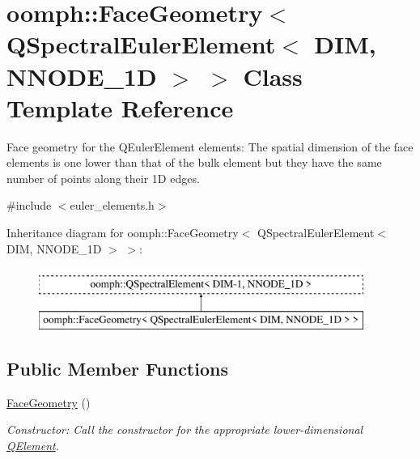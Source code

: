 \hypertarget{classoomph_1_1FaceGeometry_3_01QSpectralEulerElement_3_01DIM_00_01NNODE__1D_01_4_01_4}{}\section{oomph\+:\+:Face\+Geometry$<$ Q\+Spectral\+Euler\+Element$<$ D\+IM, N\+N\+O\+D\+E\+\_\+1D $>$ $>$ Class Template Reference}
\label{classoomph_1_1FaceGeometry_3_01QSpectralEulerElement_3_01DIM_00_01NNODE__1D_01_4_01_4}


Face geometry for the Q\+Euler\+Element elements\+: The spatial dimension of the face elements is one lower than that of the bulk element but they have the same number of points along their 1D edges.  




{\ttfamily \#include $<$euler\+\_\+elements.\+h$>$}

Inheritance diagram for oomph\+:\+:Face\+Geometry$<$ Q\+Spectral\+Euler\+Element$<$ D\+IM, N\+N\+O\+D\+E\+\_\+1D $>$ $>$\+:\begin{figure}[H]
\begin{center}
\leavevmode
\includegraphics[height=2.000000cm]{classoomph_1_1FaceGeometry_3_01QSpectralEulerElement_3_01DIM_00_01NNODE__1D_01_4_01_4}
\end{center}
\end{figure}
\subsection*{Public Member Functions}
\begin{DoxyCompactItemize}
\item 
\hyperlink{classoomph_1_1FaceGeometry_3_01QSpectralEulerElement_3_01DIM_00_01NNODE__1D_01_4_01_4_ac68e4133f1164f81113d8928ede1f6ff}{Face\+Geometry} ()
\begin{DoxyCompactList}\small\item\em Constructor\+: Call the constructor for the appropriate lower-\/dimensional \hyperlink{classoomph_1_1QElement}{Q\+Element}. \end{DoxyCompactList}\end{DoxyCompactItemize}


